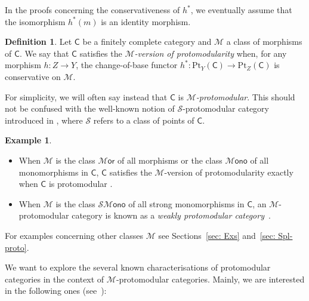 \documentclass[10pt,a4paper]{amsart}
\theoremstyle{plain}
\theoremstyle{definition}
\newtheorem{definition}[subsection]{Definition}
\newtheorem{example}[subsection]{Example}
\theoremstyle{remark}
\newcommand{\defn}[1]{\emph{#1}}
\newcommand{\C}{\ensuremath{\mathsf{C}}}
\newcommand{\Pt}{\ensuremath{\mathrm{Pt}}}
\newcommand{\M}{\ensuremath{\mathscr{M}}}
\newcommand{\Sscr}{\ensuremath{\mathscr{S}}}
\newcommand{\Mor}{\ensuremath{\mathscr{M}\mathsf{or}}}
\newcommand{\Mono}{\ensuremath{\mathscr{M}\mathsf{ono}}}
\newcommand{\SMono}{\ensuremath{\mathscr{SM}\mathsf{ono}}}
\begin{document}
In the proofs concerning the conservativeness of $h^*$, we eventually assume that the isomorphism $h^*(m)$ is an identity morphism.

\begin{definition}\label{def: M-proto}
Let $\C$ be a finitely complete category and $\M$ a class of morphisms of $\C$. We say that $\C$ satisfies the \defn{$\M$-version of protomodularity} when, for any morphism $h\colon Z\to Y$, the change-of-base functor $h^*\colon \Pt_Y(\C)\to \Pt_Z(\C)$ is conservative on $\M$.
\end{definition}
For simplicity, we will often say instead that $\C$ is \defn{$\M$-protomodular}. This should not be confused with the well-known notion of $\Sscr$-protomodular category introduced in \cite{BMFMS}, where $\Sscr$ refers to a class of points of $\C$.

\begin{example}\label{ex: M-proto cats}
\begin{itemize}
	\item[1.] %
When $\M$ is the class $\Mor$ of all morphisms or the class $\Mono$ of all monomorphisms in $\C$, $\C$ satisfies the $\M$-version of protomodularity exactly when $\C$ is protomodular \cite{NEKEAC}.
	\item[2.] When $\M$ is the class $\SMono$ of all strong monomorphisms in $\C$, an $\M$-protomodular category is known as a \emph{weakly protomodular category}~\cite{CM-FM}.
\end{itemize}
	\item[3.] For examples concerning other classes $\M$ see Sections~\ref{sec: Exs} and~\ref{sec: Spl-proto}.
\end{example}

We want to explore the several known characterisations of protomodular categories in the context of $\M$-protomodular categories. Mainly, we are interested in the following ones (see~\cite{NEKEAC,BB}):
\end{document}

